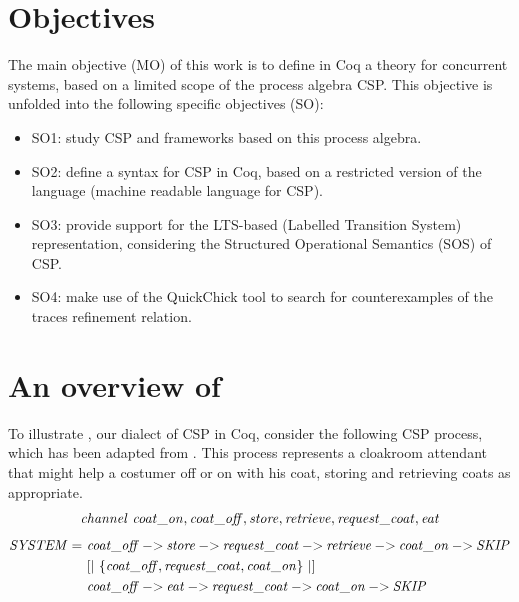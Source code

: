 \section{Objectives}

The main objective (MO) of this work is to define in Coq a theory for concurrent systems, based on a limited scope of the process algebra CSP. This objective is unfolded into the following specific objectives (SO):

\begin{itemize}
	\item SO1: study CSP and frameworks based on this process algebra.
	\item SO2: define a syntax for CSP in Coq, based on a restricted version of the \CSPM{} language (machine readable language for CSP).
	\item SO3: provide support for the LTS-based (Labelled Transition System) representation, considering the Structured Operational Semantics (SOS) of CSP.
	\item SO4: make use of the QuickChick \cite{pierce:quickchick} tool to search for counterexamples of the traces refinement relation.
\end{itemize}

\section{An overview of \CSPcoq{}}

To illustrate \CSPcoq{}, our dialect of CSP in Coq, consider the following CSP process, which has been adapted from . This process represents a cloakroom attendant that might help a costumer off or on with his coat, storing and retrieving coats as appropriate.
%
\begin{align}
	\mathit{channel\ coat\_on, coat\_off, store, retrieve, request\_coat, eat}\notag
\end{align}
\begin{align}
	\mathit{SYSTEM} =\ &\mathit{coat\_off \mathbin{{-}{>}} store \mathbin{{-}{>}} request\_coat \mathbin{{-}{>}} retrieve \mathbin{{-}{>}} coat\_on \mathbin{{-}{>}} SKIP}\notag\\
			 &[|\ \{\mathit{coat\_off, request\_coat, coat\_on}\}\ |]\notag\\
	  		 &\mathit{coat\_off \mathbin{{-}{>}} eat \mathbin{{-}{>}} request\_coat \mathbin{{-}{>}} coat\_on \mathbin{{-}{>}} SKIP}\notag
\end{align}

